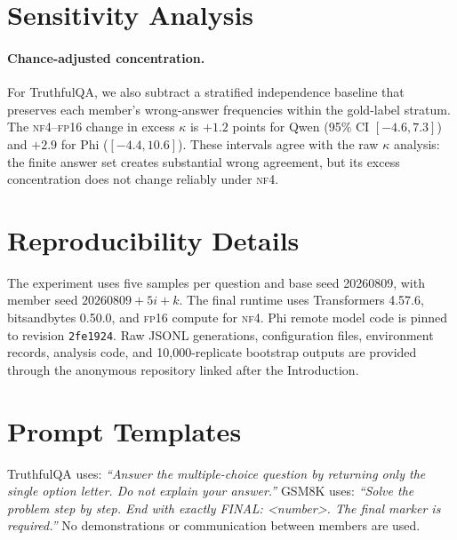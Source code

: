 \documentclass[11pt]{article}
\newcommand{\nf}{\textsc{nf4}}
\newcommand{\fp}{\textsc{fp16}}
\begin{document}
\appendix
\clearpage

\section{Sensitivity Analysis}

\paragraph{Chance-adjusted concentration.}
For TruthfulQA, we also subtract a stratified independence baseline that preserves each member's wrong-answer frequencies within the gold-label stratum. The \nf{}--\fp{} change in excess $\kappa$ is $+1.2$ points for Qwen (95\% CI $[-4.6,7.3]$) and $+2.9$ for Phi ($[-4.4,10.6]$). These intervals agree with the raw $\kappa$ analysis: the finite answer set creates substantial wrong agreement, but its excess concentration does not change reliably under \nf{}.

\section{Reproducibility Details}

The experiment uses five samples per question and base seed 20260809, with member seed $20260809+5i+k$. The final runtime uses Transformers 4.57.6, bitsandbytes 0.50.0, and \fp{} compute for \nf{}. Phi remote model code is pinned to revision \texttt{2fe1924}. Raw JSONL generations, configuration files, environment records, analysis code, and 10,000-replicate bootstrap outputs are provided through the anonymous repository linked after the Introduction.

\section{Prompt Templates}

TruthfulQA uses: \emph{``Answer the multiple-choice question by returning only the single option letter. Do not explain your answer.''} GSM8K uses: \emph{``Solve the problem step by step. End with exactly FINAL: <number>. The final marker is required.''} No demonstrations or communication between members are used.
\end{document}
